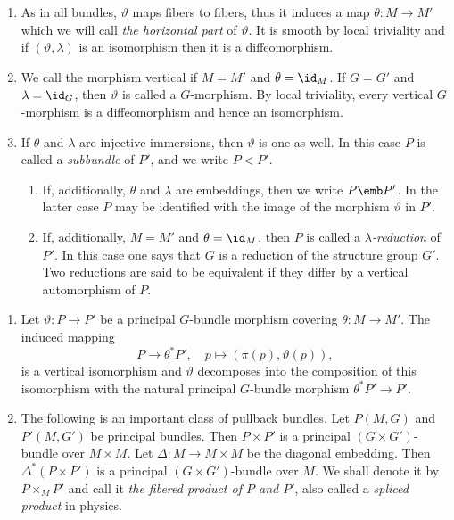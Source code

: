 \begin{rem}\label{rem 1.1.8 RS2}
    \begin{enumerate}
        \item As in all bundles, $\vartheta$ maps fibers to fibers, thus it induces a map $\theta:M\to M'$ which we will call \emph{the horizontal part} of $\vartheta$. It is smooth by local triviality and if $(\vartheta,\lambda)$ is an isomorphism then it is a diffeomorphism.
        \item We call the morphism vertical if $M=M'$ and $\theta=\id_M$. If $G=G'$ and $\lambda=\id_G$, then $\vartheta$ is called a $G$-morphism. By local triviality, every vertical $G$-morphism is a diffeomorphism and hence an isomorphism.
        \item If $\theta$ and $\lambda$ are injective immersions, then $\vartheta$ is one as well. In this case $P$ is called a \emph{subbundle} of $P'$, and we write $P<P'$.
        \begin{enumerate}
            \item If, additionally, $\theta$ and $\lambda$ are embeddings, then we write $P\emb P'$. In the latter case $P$ may be identified with the image of the morphism $\vartheta$ in $P'$.
            \item If, additionally, $M=M'$ and $\theta=\id_M$, then $P$ is called a \emph{$\lambda$-reduction} of $P'$. In this case one says that $G$ is a reduction of the structure group $G'$. Two reductions are said to be equivalent  if they differ by a vertical automorphism of $P$.
        \end{enumerate}
    \end{enumerate}
\end{rem}

\begin{rem}\label{rem 1.1.9 RS2}
    \begin{enumerate}
        \item Let $\vartheta:P\to P'$ be a principal $G$-bundle morphism covering $\theta:M\to M'$. The induced mapping
        \[P\to \theta^\ast P',\quad p\mapsto (\pi(p),\vartheta(p)),\]
        is a vertical isomorphism and $\vartheta$ decomposes into the composition of this isomorphism with the natural principal $G$-bundle morphism $\theta^\ast P'\to P'$.
        \item The following is an important class of pullback bundles. Let $P(M,G)$ and $P'(M,G')$ be principal bundles. Then $P\times P'$ is a principal $(G\times G')$-bundle over $M\times M$. Let $\Delta:M\to M\times M$ be the diagonal embedding. Then $\Delta^\ast(P\times P')$ is a principal $(G\times G')$-bundle over $M$. We shall denote it by $P\times_M P'$ and call it \emph{the fibered product of $P$ and $P'$}, also called a \emph{spliced product} in physics.
    \end{enumerate}
\end{rem}








